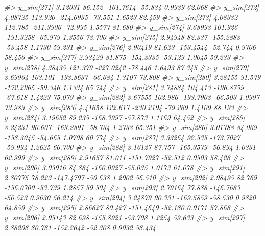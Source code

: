 \documentclass[
  10pt,
  italian,
  a4paper,
  extrafontsizes,onecolumn,openright
  ]{memoir}
\newenvironment{Shaded}{\begin{snugshade}}{\end{snugshade}}
\newcommand{\CommentTok}[1]{\textcolor[rgb]{0.56,0.35,0.01}{\textit{#1}}}
\begin{document}
\begin{Shaded}
\begin{Highlighting}[]
\CommentTok{\#\textgreater{}   y\_sim[271]  3.12031  86.152 {-}161.7614 {-}55.834  0.9939  62.068}
\CommentTok{\#\textgreater{}   y\_sim[272]  4.08725 113.920 {-}214.6935 {-}73.551  1.6523  82.459}
\CommentTok{\#\textgreater{}   y\_sim[273]  4.08332 112.785 {-}211.3906 {-}72.995  1.5577  81.680}
\CommentTok{\#\textgreater{}   y\_sim[274]  3.68993 101.926 {-}191.3258 {-}65.979  1.3556  73.700}
\CommentTok{\#\textgreater{}   y\_sim[275]  2.94948  82.337 {-}155.2883 {-}53.458  1.1730  59.231}
\CommentTok{\#\textgreater{}   y\_sim[276]  2.90419  81.623 {-}153.4544 {-}52.744  0.9706  58.456}
\CommentTok{\#\textgreater{}   y\_sim[277]  2.93429  81.875 {-}154.3335 {-}53.129  1.0045  59.233}
\CommentTok{\#\textgreater{}   y\_sim[278]  4.38435 121.379 {-}227.0242 {-}78.446  1.6493  87.345}
\CommentTok{\#\textgreater{}   y\_sim[279]  3.69964 103.101 {-}193.8637 {-}66.684  1.3107  73.808}
\CommentTok{\#\textgreater{}   y\_sim[280]  3.28155  91.579 {-}172.2965 {-}59.346  1.1334  65.744}
\CommentTok{\#\textgreater{}   y\_sim[281]  3.74884 104.413 {-}196.8759 {-}67.618  1.4223  75.079}
\CommentTok{\#\textgreater{}   y\_sim[282]  3.67555 102.986 {-}193.7903 {-}66.503  1.0997  73.983}
\CommentTok{\#\textgreater{}   y\_sim[283]  4.41658 122.617 {-}230.2194 {-}79.269  1.4109  88.193}
\CommentTok{\#\textgreater{}   y\_sim[284]  3.19652  89.235 {-}168.3997 {-}57.873  1.1169  64.452}
\CommentTok{\#\textgreater{}   y\_sim[285]  3.24231  90.607 {-}169.2891 {-}58.734  1.2733  65.351}
\CommentTok{\#\textgreater{}   y\_sim[286]  3.01788  84.069 {-}158.3045 {-}54.665  1.0708  60.774}
\CommentTok{\#\textgreater{}   y\_sim[287]  3.33264  92.535 {-}173.7027 {-}59.994  1.2625  66.700}
\CommentTok{\#\textgreater{}   y\_sim[288]  3.16127  87.757 {-}165.3579 {-}56.894  1.0331  62.999}
\CommentTok{\#\textgreater{}   y\_sim[289]  2.91657  81.011 {-}151.7927 {-}52.512  0.9503  58.428}
\CommentTok{\#\textgreater{}   y\_sim[290]  3.03916  84.884 {-}160.0927 {-}55.035  1.0173  61.078}
\CommentTok{\#\textgreater{}   y\_sim[291]  2.80775  78.223 {-}147.4797 {-}50.638  1.2902  56.510}
\CommentTok{\#\textgreater{}   y\_sim[292]  2.98495  82.769 {-}156.0700 {-}53.739  1.2857  59.504}
\CommentTok{\#\textgreater{}   y\_sim[293]  2.79164  77.888 {-}146.7683 {-}50.523  0.9630  56.214}
\CommentTok{\#\textgreater{}   y\_sim[294]  3.24879  90.331 {-}169.5859 {-}58.530  0.9820  64.859}
\CommentTok{\#\textgreater{}   y\_sim[295]  2.86627  80.427 {-}151.4649 {-}52.180  0.9171  57.868}
\CommentTok{\#\textgreater{}   y\_sim[296]  2.95143  82.698 {-}155.8921 {-}53.708  1.2254  59.633}
\CommentTok{\#\textgreater{}   y\_sim[297]  2.88208  80.781 {-}152.2642 {-}52.308  0.9032  58.434}

\end{Highlighting}
\end{Shaded}
\end{document}
